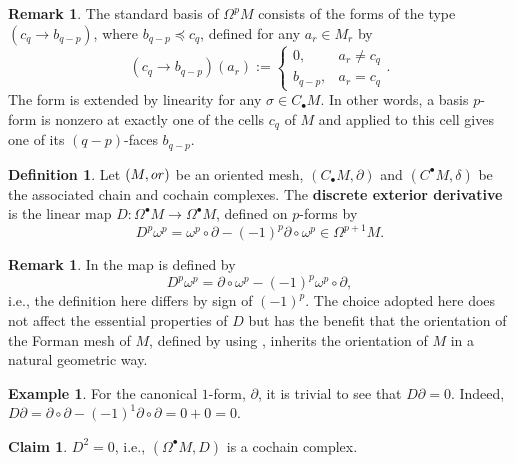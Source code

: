 \documentclass{elsarticle}
\theoremstyle{definition}
\newtheorem{claim}[theorem]{Claim}
\newtheorem{definition}[theorem]{Definition}
\newtheorem{example}[theorem]{Example}
\newtheorem{remark}[theorem]{Remark}
\newcommand{\OR}{\mathop{\rm or}\nolimits}   %
\begin{document}
\begin{remark}
  The standard basis of $\Omega^{p} M$ consists of the forms of the type $(c_q \to b_{q - p})$, where $b_{q - p} \preceq c_q$, defined for any $a_r \in M_r$ by
  \begin{equation}
    (c_q \to b_{q - p})(a_r) := 
      \begin{cases}
        0   , & a_r \neq c_q \\
        b_{q - p}, & a_r = c_q
      \end{cases}.
  \end{equation}
  The form is extended by linearity for any $\sigma \in C_{\bullet} M.$ In other words, a basis $p$-form is nonzero at exactly one of the cells $c_q$ of $M$ and applied to this cell gives one of its $(q - p)$-faces $b_{q - p}$.
\end{remark}
\begin{definition}
\label{thm:discrete_exterior_derivative}
  Let  $(M, \OR)$ be an oriented mesh,
  $(C_{\bullet}M, \partial)$ and $(C^{\bullet}M, \delta)$
  be the associated chain and cochain complexes.
  The \textbf{discrete exterior derivative} is the linear map $D \colon \Omega^{\bullet} M \to \Omega^{\bullet} M$, defined on $p$-forms by
  \begin{equation}
    D^p \omega^p 
      = \omega^p \circ \partial
        - (-1)^{p} \partial \circ \omega^p \in \Omega^{p + 1} M.
  \end{equation}
\end{definition}
\begin{remark}
  In \cite{Forman2002_Novikov} the map is defined by
  \begin{equation*}
    D^p \omega^p = \partial \circ \omega^p - (-1)^{p} \omega^p \circ \partial,
  \end{equation*}
  i.e., the definition here differs by sign of $(-1)^{p}$. The choice adopted here does not affect the essential properties of $D$ but has the benefit that the orientation of the Forman mesh of $M$, defined by using , inherits the orientation of $M$ in a natural geometric way.
\end{remark}
\begin{example}
  For the canonical $1$-form, $\partial$, it is trivial to see that $D \partial = 0$. Indeed,
  $D \partial
    = \partial \circ \partial - (-1)^{1} \partial \circ \partial
    = 0 + 0
    = 0.$
\end{example}
\begin{claim}
  $D^2 = 0$, i.e., $(\Omega^{\bullet} M, D)$ is a cochain complex.
\end{claim}
\end{document}
